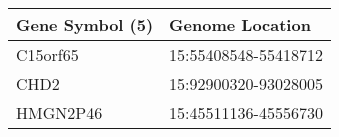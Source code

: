 \begin{tabular}{ll}
\toprule
Gene Symbol (5) &      Genome Location \\
\midrule
       C15orf65 & 15:55408548-55418712 \\
           CHD2 & 15:92900320-93028005 \\
       HMGN2P46 & 15:45511136-45556730 \\
\bottomrule
\end{tabular}
